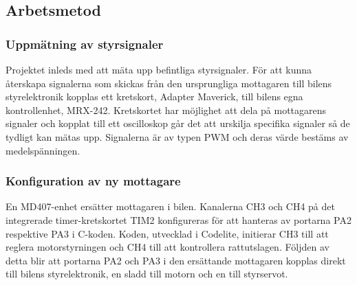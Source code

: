 \documentclass[a4paper]{article}
\begin{document}

\subsection{Arbetsmetod}
\subsubsection{Uppmätning av styrsignaler}
Projektet inleds med att mäta upp befintliga styrsignaler. För att kunna återskapa signalerna som skickas från den ursprungliga mottagaren till bilens styrelektronik kopplas ett kretskort, Adapter Maverick, till bilens egna kontrollenhet, MRX-242. Kretskortet har möjlighet att dela på mottagarens signaler och kopplat till ett oscilloskop går det att urskilja specifika signaler så de tydligt kan mätas upp. Signalerna är av typen PWM och deras värde bestäms av medelspänningen. 


\subsubsection{Konfiguration av ny mottagare}

En MD407-enhet ersätter mottagaren i bilen. Kanalerna CH3 och CH4 på det integrerade timer-kretskortet TIM2 konfigureras för att hanteras av portarna PA2 respektive PA3 i C-koden. Koden, utvecklad i Codelite, initierar CH3 till att reglera motorstyrningen och CH4 till att kontrollera rattutslagen. Följden av detta blir att portarna PA2 och PA3 i den ersättande mottagaren kopplas direkt till bilens styrelektronik, en sladd till motorn och en till styrservot. 
\end{document}
